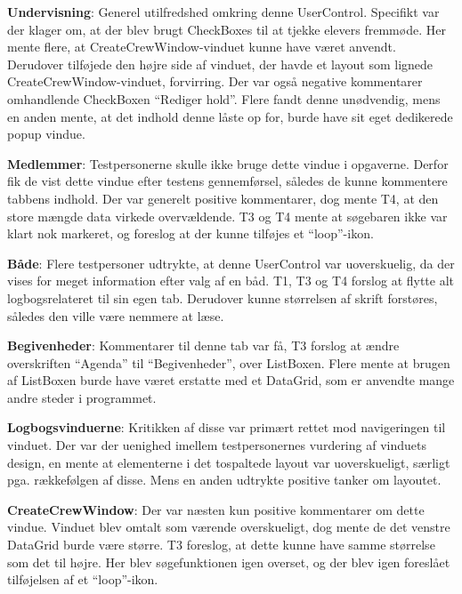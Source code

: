 \textbf{Undervisning}: 
Generel utilfredshed omkring denne UserControl.
Specifikt var der klager om, at der blev brugt CheckBoxes til at tjekke elevers fremmøde.
Her mente flere, at CreateCrewWindow-vinduet kunne have været anvendt. 
Derudover tilføjede den højre side af vinduet, der havde et layout som lignede CreateCrewWindow-vinduet, forvirring. 
Der var også negative kommentarer omhandlende CheckBoxen ``Rediger hold''. 
Flere fandt denne unødvendig, mens en anden mente, at det indhold denne låste op for, burde have sit eget dedikerede popup vindue.

\textbf{Medlemmer}:
Testpersonerne skulle ikke bruge dette vindue i opgaverne.
Derfor fik de vist dette vindue efter testens gennemførsel, således de kunne kommentere tabbens indhold. 
Der var generelt positive kommentarer, dog mente T4, at den store mængde data virkede overvældende. 
T3 og T4 mente at søgebaren ikke var klart nok markeret, og foreslog at der kunne tilføjes et ``loop''-ikon. 

\textbf{Både}:
Flere testpersoner udtrykte, at denne UserControl var uoverskuelig, da der vises for meget information efter valg af en båd.
T1, T3 og T4 forslog at flytte alt logbogsrelateret til sin egen tab.
Derudover kunne størrelsen af skrift forstøres, således den ville være nemmere at læse. 

\textbf{Begivenheder}:
Kommentarer til denne tab var få, T3 forslog at ændre overskriften ``Agenda'' til ``Begivenheder'', over ListBoxen.
Flere mente at brugen af ListBoxen burde have været erstatte med et DataGrid, som er anvendte mange andre steder i programmet. 

\textbf{Logbogsvinduerne}:
Kritikken af disse var primært rettet mod navigeringen til vinduet. 
Der var der uenighed imellem testpersonernes vurdering af vinduets design, en mente at elementerne i det tospaltede layout var uoverskueligt, særligt pga. rækkefølgen af disse. 
Mens en anden udtrykte positive tanker om layoutet.

\textbf{CreateCrewWindow}:
Der var næsten kun positive kommentarer om dette vindue.
Vinduet blev omtalt som værende overskueligt, dog mente de det venstre DataGrid burde være større.
T3 foreslog, at dette kunne have samme størrelse som det til højre. 
Her blev søgefunktionen igen overset, og der blev igen foreslået tilføjelsen af et ``loop''-ikon.

